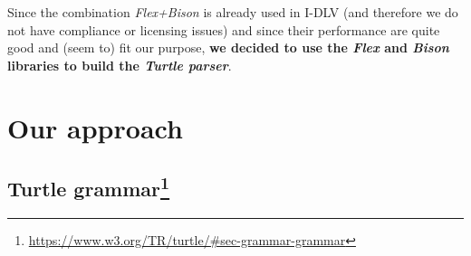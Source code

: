 \documentclass[oneside]{book}
\begin{document}
Since the combination \emph{Flex+Bison} is already used in I-DLV (and therefore we do not have compliance or licensing issues) and since their performance are quite good and (seem to) fit our purpose, \textbf{we decided to use the \emph{Flex} and \emph{Bison} libraries to build the \emph{Turtle parser}}.

\section{Our approach}

\subsection{Turtle grammar\texorpdfstring{\protect\footnote{\url{https://www.w3.org/TR/turtle/\#sec-grammar-grammar}}}{}}
\end{document}
